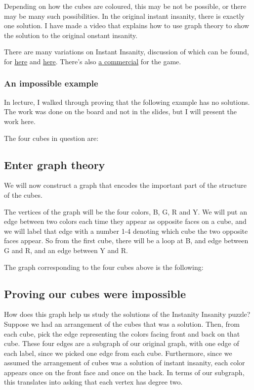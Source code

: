\documentclass[]{article}
\begin{document}
Depending on how the cubes are coloured, this may be not be possible, or
there may be many such possibilities. In the original instant insanity,
there is exactly one solution. I have made a video that explains how to
use graph theory to show the solution to the original onstant insanity.

There are many variations on Instant Insanity, discussion of which can
be found, for
\href{http://www.cs.brandeis.edu/~storer/JimPuzzles/ZPAGES/zzzInstantInsanity.html}{here}
and \href{http://www.jaapsch.net/puzzles/insanity.htm}{here}. There's
also \href{https://www.youtube.com/watch?v=CQ2gHSKZBEw}{a commercial}
for the game.

\subsubsection{An impossible example}\label{an-impossible-example}

In lecture, I walked through proving that the following example has no
solutions. The work was done on the board and not in the slides, but I
will present the work here.

The four cubes in question are:

\subsection{Enter graph theory}\label{enter-graph-theory}

We will now construct a graph that encodes the important part of the
structure of the cubes.

The vertices of the graph will be the four colors, B, G, R and Y. We
will put an edge between two colors each time they appear as opposite
faces on a cube, and we will label that edge with a number 1-4 denoting
which cube the two opposite faces appear. So from the first cube, there
will be a loop at B, and edge between G and R, and an edge between Y and
R.

The graph corresponding to the four cubes above is the following:

\subsection{Proving our cubes were
impossible}\label{proving-our-cubes-were-impossible}

How does this graph help us study the solutions of the Instanity
Insanity puzzle? Suppose we had an arrangement of the cubes that was a
solution. Then, from each cube, pick the edge representing the colors
facing front and back on that cube. These four edges are a subgraph of
our original graph, with one edge of each label, since we picked one
edge from each cube. Furthermore, since we assumed the arrangement of
cubes was a solution of instant insanity, each color appears once on the
front face and once on the back. In terms of our subgraph, this
translates into asking that each vertex has degree two.
\end{document}
